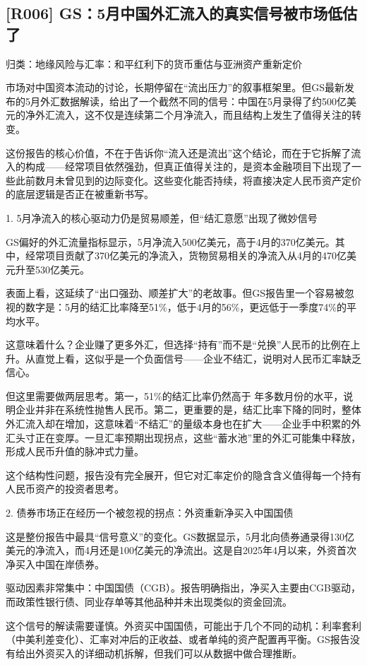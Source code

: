 \documentclass[11pt]{ctexart}
\begin{document}
\subsection{[R006] GS：5月中国外汇流入的真实信号被市场低估了}
{\small\color{refgray}归类：地缘风险与汇率：和平红利下的货币重估与亚洲资产重新定价}

市场对中国资本流动的讨论，长期停留在“流出压力”的叙事框架里。但GS最新发布的5月外汇数据解读，给出了一个截然不同的信号：中国在5月录得了约500亿美元的净外汇流入，这不仅是连续第二个月净流入，而且结构上发生了值得关注的转变。

这份报告的核心价值，不在于告诉你“流入还是流出”这个结论，而在于它拆解了流入的构成——经常项目依然强劲，但真正值得关注的，是资本金融项目下出现了一些此前数月未曾见到的边际变化。这些变化能否持续，将直接决定人民币资产定价的底层逻辑是否正在被重新书写。

1. 5月净流入的核心驱动力仍是贸易顺差，但“结汇意愿”出现了微妙信号

GS偏好的外汇流量指标显示，5月净流入500亿美元，高于4月的370亿美元。其中，经常项目贡献了370亿美元的净流入，货物贸易相关的净流入从4月的470亿美元升至530亿美元。

表面上看，这延续了“出口强劲、顺差扩大”的老故事。但GS报告里一个容易被忽视的数字是：5月的结汇比率降至51\%，低于4月的56\%，更远低于一季度74\%的平均水平。

这意味着什么？企业赚了更多外汇，但选择“持有”而不是“兑换”人民币的比例在上升。从直觉上看，这似乎是一个负面信号——企业不结汇，说明对人民币汇率缺乏信心。

但这里需要做两层思考。第一，51\%的结汇比率仍然高于 年多数月份的水平，说明企业并非在系统性抛售人民币。第二，更重要的是，结汇比率下降的同时，整体外汇流入却在增加，这意味着“不结汇”的量级本身也在扩大——企业手中积累的外汇头寸正在变厚。一旦汇率预期出现拐点，这些“蓄水池”里的外汇可能集中释放，形成人民币升值的脉冲式力量。

这个结构性问题，报告没有完全展开，但它对汇率定价的隐含含义值得每一个持有人民币资产的投资者思考。

2. 债券市场正在经历一个被忽视的拐点：外资重新净买入中国国债

这是整份报告中最具“信号意义”的变化。GS数据显示，5月北向债券通录得130亿美元的净流入，而4月还是100亿美元的净流出。这是自2025年4月以来，外资首次净买入中国在岸债券。

驱动因素非常集中：中国国债（CGB）。报告明确指出，净买入主要由CGB驱动，而政策性银行债、同业存单等其他品种并未出现类似的资金回流。

这个信号的解读需要谨慎。外资买中国国债，可能出于几个不同的动机：利率套利（中美利差变化）、汇率对冲后的正收益、或者单纯的资产配置再平衡。GS报告没有给出外资买入的详细动机拆解，但我们可以从数据中做合理推断。
\end{document}

